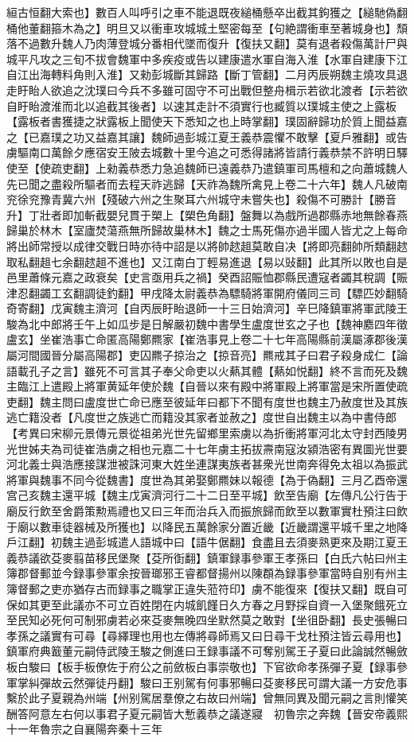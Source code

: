 絙古恒翻大索也】數百人叫呼引之車不能退既夜縋桶懸卒出截其鉤獲之【縋馳偽翻桶他董翻箍木為之】明旦又以衝車攻城城土堅密每至【句絶謂衝車至著城身也】頹落不過數升魏人乃肉薄登城分番相代墜而復升【復扶又翻】莫有退者殺傷萬計尸與城平凡攻之三旬不拔會魏軍中多疾疫或告以建康遣水軍自海入淮【水軍自建康下江自江出海轉料角則入淮】又勑彭城斷其歸路【斷丁管翻】二月丙辰朔魏主燒攻具退走盱眙人欲追之沈璞曰今兵不多雖可固守不可出戰但整舟楫示若欲北渡者【示若欲自盱眙渡淮而北以追截其後者】以速其走計不須實行也臧質以璞城主使之上露板【露板者書獲捷之狀露板上聞使天下悉知之也上時掌翻】璞固辭歸功於質上聞益嘉之【已嘉璞之功又益嘉其讓】魏師過彭城江夏王義恭震懼不敢擊【夏戶雅翻】或告虜驅南口萬餘夕應宿安王陂去城數十里今追之可悉得諸將皆請行義恭禁不許明日驛使至【使疏吏翻】上勑義恭悉力急追魏師已遠義恭乃遣鎮軍司馬檀和之向蕭城魏人先已聞之盡殺所驅者而去程天祚逃歸【天祚為魏所禽見上卷二十六年】魏人凡破南兖徐兖豫青冀六州【殘破六州之生聚耳六州城守未嘗失也】殺傷不可勝計【勝音升】丁壯者即加斬截嬰兒貫于槊上【槊色角翻】盤舞以為戲所過郡縣赤地無餘春燕歸巢於林木【室廬焚蕩燕無所歸故巢林木】魏之士馬死傷亦過半國人皆尤之上每命將出師常授以成律交戰日時亦待中詔是以將帥趑趄莫敢自决【將即亮翻帥所類翻趑取私翻趄七余翻趑趄不進也】又江南白丁輕易進退【易以䜴翻】此其所以敗也自是邑里蕭條元嘉之政衰矣【史言亟用兵之禍】癸酉詔賑恤郡縣民遭寇者蠲其稅調【賑津忍翻蠲工玄翻調徒釣翻】甲戌降太尉義恭為驃騎將軍開府儀同三司【驃匹妙翻騎奇寄翻】戊寅魏主濟河【自丙辰盱眙退師一十三日始濟河】辛巳降鎮軍將軍武陵王駿為北中郎將壬午上如瓜步是日解嚴初魏中書學生盧度世玄之子也【魏神䴥四年徵盧玄】坐崔浩事亡命匿高陽鄭羆家【崔浩事見上卷二十七年高陽縣前漢屬涿郡後漢屬河間國晉分屬高陽郡】吏囚羆子掠治之【掠音亮】羆戒其子曰君子殺身成仁【論語載孔子之言】雖死不可言其子奉父命吏以火爇其體【爇如悦翻】終不言而死及魏主臨江上遣殿上將軍黄延年使於魏【自晉以來有殿中將軍殿上將軍當是宋所置使疏吏翻】魏主問曰盧度世亡命已應至彼延年曰都下不聞有度世也魏主乃赦度世及其族逃亡籍没者【凡度世之族逃亡而籍没其家者並赦之】度世自出魏主以為中書侍郎　【考異曰宋柳元景傳元景從祖弟光世先留鄉里索虜以為折衝將軍河北太守封西陵男光世姊夫為司徒崔浩虜之相也元嘉二十七年虜主拓拔燾南寇汝潁浩密有異圖光世要河北義士與浩應接謀泄被誅河東大姓坐連謀夷族者甚衆光世南奔得免太祖以為振武將軍與魏事不同今從魏書】度世為其弟娶鄭羆妹以報德【為于偽翻】三月乙酉帝還宫己亥魏主還平城【魏主戊寅濟河行二十二日至平城】飲至告廟【左傳凡公行告于廟反行飲至舍爵策勲焉禮也又曰三年而治兵入而振旅歸而飲至以數軍實杜預注曰飲于廟以數車徒器械及所獲也】以降民五萬餘家分置近畿【近畿謂還平城千里之地降戶江翻】初魏主過彭城遣人語城中曰【語牛倨翻】食盡且去須麥熟更來及期江夏王義恭議欲芟麥翦苗移民堡聚【芟所衘翻】鎮軍録事參軍王孝孫曰【白氏六帖曰州主簿郡督郵並今録事參軍余按晉瑯邪王睿都督揚州以陳頵為録事參軍當時自别有州主簿督郵之吏亦猶存古而録事之職掌正違失蒞符印】虜不能復來【復扶又翻】既自可保如其更至此議亦不可立百姓閉在内城飢饉日久方春之月野採自資一入堡聚餓死立至民知必死何可制邪虜若必來芟麥無晚四坐默然莫之敢對【坐徂卧翻】長史張暢曰孝孫之議實有可尋【尋繹理也用也左傳將尋師焉又曰日尋干戈杜預注皆云尋用也】鎮軍府典籖董元嗣侍武陵王駿之側進曰王録事議不可奪别駕王子夏曰此論誠然暢斂板白駿曰【板手板僚佐于府公之前斂板白事崇敬也】下官欲命孝孫彈子夏【録事參軍掌糾彈故云然彈徒丹翻】駿曰王别駕有何事邪暢曰芟麥移民可謂大議一方安危事繫於此子夏親為州端【州别駕居羣僚之右故曰州端】曾無同異及聞元嗣之言則懽笑酬答阿意左右何以事君子夏元嗣皆大慙義恭之議遂寢　初魯宗之奔魏【晉安帝義熙十一年魯宗之自襄陽奔秦十三年